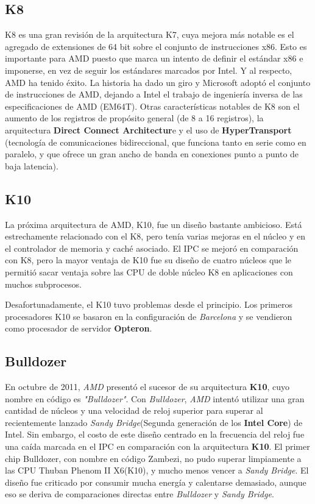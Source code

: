 \subsection{K8}
K8 es una gran revisión de la arquitectura K7, cuya mejora más notable es el agregado de extensiones de 64 bit sobre el conjunto de instrucciones x86. Esto es importante para AMD puesto 
que marca un intento de definir el estándar x86 e imponerse, en vez de seguir los estándares marcados por Intel. Y al respecto, AMD ha tenido éxito. La historia ha dado un giro y 
Microsoft adoptó el conjunto de instrucciones de AMD, dejando a Intel el trabajo de ingeniería inversa de las especificaciones de AMD (EM64T). Otras características notables de K8 
son el aumento de los registros de propósito general (de 8 a 16 registros), la arquitectura \textbf{Direct Connect Architectur}e y el uso de \textbf{HyperTransport}
(tecnología de comunicaciones bidireccional, que funciona tanto en serie como en paralelo, y que ofrece un gran ancho de banda en conexiones punto a punto de baja latencia).



\subsection{K10}
La próxima arquitectura de AMD, K10, fue un diseño bastante ambicioso. Está estrechamente relacionado con el K8, pero tenía varias mejoras en el núcleo y en el controlador de memoria y caché asociado. 
El IPC se mejoró en comparación con K8, pero la mayor ventaja de K10 fue su diseño de cuatro núcleos que le permitió sacar ventaja sobre las CPU de doble núcleo K8 en aplicaciones con muchos subprocesos.

Desafortunadamente, el K10 tuvo problemas desde el principio. Los primeros procesadores K10 se basaron en la configuración de \emph{Barcelona} y se vendieron como procesador de servidor \textbf{Opteron}.

\subsection{Bulldozer}
En octubre de 2011, \emph{AMD} presentó el sucesor de su arquitectura \textbf{K10}, cuyo nombre en código es \emph{"Bulldozer"}. Con \emph{Bulldozer}, \emph{AMD} intentó utilizar una gran cantidad 
de núcleos y una velocidad de reloj superior para superar al recientemente lanzado \emph{Sandy Bridge}(Segunda generación de los \textbf{Intel Core}) de Intel. Sin embargo, el costo de este diseño 
centrado en la frecuencia del reloj fue una caída marcada en el IPC en comparación con la arquitectura \textbf{K10}. El primer chip Bulldozer, con nombre en código Zambezi, no pudo superar 
limpiamente a las CPU Thuban Phenom II X6(K10), y mucho menos vencer a \emph{Sandy Bridge}.
El diseño fue criticado por consumir mucha energía y calentarse demasiado, aunque eso se deriva de comparaciones directas entre \emph{Bulldozer} y \emph{Sandy Bridge}.

